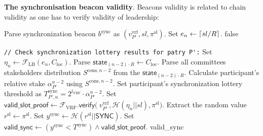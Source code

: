 \bigbreak
\bigbreak
\noindent
{}
\textbf{The synchronisation beacon validity}.\label{apndx:sync-beacon-validity-protocol}
Beacons validity is related to chain validity as one has to verify validity of leadership:
\begin{protocol}
    \caption{$\textsf{ValidBeacon}(P, \text{sid}, R, l_{\text{VRF}}, K_{\text{f}}, b^{\text{sync}}, \mathcal{C}_{\text{loc}})$}
    \begin{algorithmic}[1]
        \State Parse synchronization beacon $b^{\text{sync}}$ as $(v_{P'}^{\text{vrf}}, sl, \pi^{\text{sl}})$.
        \State Set $e_n \leftarrow \lceil sl/\\R \rceil$.
            \State \Return \textsf{false}
        \EndIf

        \noindent
        \lstinline|// Check synchronization lottery results for patry P':|
        \State Set ${\eta_{n} \leftarrow \mathcal{F}_{\text{LB}}(e_{n}, C_{\text{loc}})}$.
        \State Parse $\textsf{state}_{(n - 2)\cdot R} \leftarrow C_{\text{loc}}$.
        \State Parse all committees stakeholders distribution $S^{\text{cons}, n - 2}$ from the $\textsf{state}_{(n - 2)\cdot R}$.
        \State Calculate participant's relative stake $\alpha^{n-2}_{P'}$ using $S^{\text{cons}, {n - 2}}$.
        \State Set participant's synchronization lottery threshold as $T_{P', n}^{\text{sync}} = 2^{l_{\text{VRF}}} \cdot \alpha^{n-2}_{P'}$.
        \State Set $\textsf{valid\_slot\_proof} \leftarrow \mathcal{F}_{\text{VRF}}\textsf{.verify(}\
        v_{P'}^{\text{vrf}}, \mathcal{H}(\eta_n || sl),\pi^{\text{sl}} \textsf{)}$.
        \State Extract the random value ${r^{\text{sl}} \leftarrow \pi^{\text{sl}}}$.
        \State Set ${y^{\text{sync}} \leftarrow {\mathcal{H}(r^{\text{sl}} || \textsf{SYNC})}}$.
        \State Set ${\textsf{valid\_sync} \leftarrow (y^{\text{sync}} < T^{\text{sync}}) \wedge \textsf{valid\_slot\_proof}}$.
        \State \Return \textsf{valid\_sync}

    \end{algorithmic}\label{alg:sync-beacon-validity-protocol}
\end{protocol}